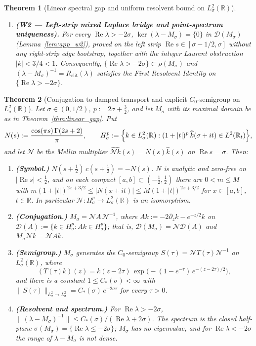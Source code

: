 \documentclass[11pt,a4paper]{article}
\newtheorem{thm}{Theorem}
\begin{document}
\begin{thm}[Linear spectral gap and uniform resolvent bound on $L^2_\sigma(\mathbb{R})$]
\begin{enumerate}
\item \textbf{(W2 --- Left-strip mixed Laplace bridge and point-spectrum uniqueness).}
  For every $\operatorname{Re}\lambda>-2\sigma$, $\ker(\lambda-M_\sigma)=\{0\}$ in
  $\mathcal{D}(M_\sigma)$ (Lemma~\ref{lem:app_w2}), proved on the \emph{left} strip
  $\operatorname{Re}s\in[\sigma-1/2,\sigma]$ without any right-strip edge bootstrap, together
  with the integer Laurent obstruction $|k|<3/4<1$.
  Consequently, $\{\operatorname{Re}\lambda>-2\sigma\}\subset\rho(M_\sigma)$ and
  $(\lambda-M_\sigma)^{-1}=R_{\mathrm{slit}}(\lambda)$ satisfies the First Resolvent Identity
  on $\{\operatorname{Re}\lambda>-2\sigma\}$.
\end{enumerate}
\end{thm}

\begin{thm}[Conjugation to damped transport and explicit $C_0$-semigroup on $L^2_\sigma(\mathbb{R})$]
\label{thm:conjugation}
Let $\sigma\in(0,1/2)$, $p:=2\sigma+\tfrac32$, and let $M_\sigma$ with its maximal domain be as in
Theorem~\ref{thm:linear_gap}.  Put
\[
N(s):=\frac{\cos(\pi s)\,\Gamma(2s+2)}{\pi},\qquad
H^p_\sigma:=\Bigl\{k\in L^2_\sigma(\mathbb{R}) : (1+|t|)^p\,\widehat{k}(\sigma+it)\in L^2(\mathbb{R}_t)\Bigr\},
\]
and let $\mathcal{N}$ be the Mellin multiplier $\widehat{\mathcal{N}k}(s)=N(s)\widehat{k}(s)$ on $\operatorname{Re}s=\sigma$.  Then:
\begin{enumerate}
\item \textbf{(Symbol.)} $N(s+\tfrac12)\,c(s+\tfrac12)=-N(s)$.  $N$ is analytic and zero-free on
  $|\operatorname{Re}s|<\tfrac12$, and on each compact $[a,b]\subset(-\tfrac12,\tfrac12)$ there are $0<m\le M$ with
  $m(1+|t|)^{2x+3/2}\le|N(x+it)|\le M(1+|t|)^{2x+3/2}$ for $x\in[a,b]$, $t\in\mathbb{R}$.  In particular
  $\mathcal{N}:H^p_\sigma\to L^2_\sigma(\mathbb{R})$ is an isomorphism.
\item \textbf{(Conjugation.)} $M_\sigma=\mathcal{N}A\,\mathcal{N}^{-1}$, where $Ak:=-2\partial_z k-e^{-z/2}k$ on
  $\mathcal{D}(A):=\{k\in H^p_\sigma: Ak\in H^p_\sigma\}$; that is, $\mathcal{D}(M_\sigma)=\mathcal{N}\mathcal{D}(A)$ and
  $M_\sigma\mathcal{N}k=\mathcal{N}Ak$.
\item \textbf{(Semigroup.)} $M_\sigma$ generates the $C_0$-semigroup $S(\tau)=\mathcal{N}T(\tau)\mathcal{N}^{-1}$ on
  $L^2_\sigma(\mathbb{R})$, where
  \[
  (T(\tau)k)(z)=k(z-2\tau)\,\exp\!\bigl(-(1-e^{-\tau})\,e^{-(z-2\tau)/2}\bigr),
  \]
  and there is a constant $1\le C_*(\sigma)<\infty$ with $\|S(\tau)\|_{L^2_\sigma\to L^2_\sigma}=C_*(\sigma)\,e^{-2\sigma\tau}$
  for every $\tau>0$.
\item \textbf{(Resolvent and spectrum.)} For $\operatorname{Re}\lambda>-2\sigma$,
  $\|(\lambda-M_\sigma)^{-1}\|\le C_*(\sigma)/(\operatorname{Re}\lambda+2\sigma)$.  The spectrum is the closed
  half-plane $\sigma(M_\sigma)=\{\operatorname{Re}\lambda\le-2\sigma\}$; $M_\sigma$ has no eigenvalue, and for
  $\operatorname{Re}\lambda<-2\sigma$ the range of $\lambda-M_\sigma$ is not dense.
\end{enumerate}
\end{thm}
\end{document}
